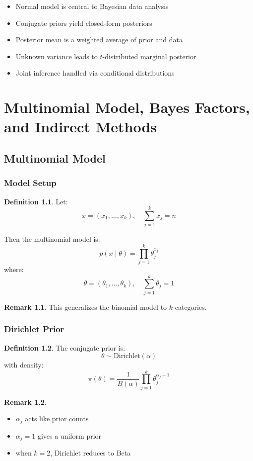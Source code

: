 \documentclass[12pt,oneside]{book}
\numberwithin{equation}{section}
\theoremstyle{definition}
\newtheorem{definition}{Definition}[section]
\newtheorem{remark}{Remark}[section]
\theoremstyle{plain}
\theoremstyle{remark}
\newcommand{\Dir}{\mathrm{Dirichlet}}
\begin{document}
\begin{itemize}
\item Normal model is central to Bayesian data analysis
\item Conjugate priors yield closed-form posteriors
\item Posterior mean is a weighted average of prior and data
\item Unknown variance leads to $t$-distributed marginal posterior
\item Joint inference handled via conditional distributions
\end{itemize}

\chapter{Multinomial Model, Bayes Factors, and Indirect Methods}

\section{Multinomial Model}

\subsection{Model Setup}

\begin{definition}
Let:
$$
x = (x_1, \dots, x_k), \quad \sum_{j=1}^k x_j = n
$$

Then the multinomial model is:
$$
p(x \mid \theta)
=
\prod_{j=1}^k \theta_j^{x_j}
$$
where:
$$
\theta = (\theta_1, \dots, \theta_k), \quad \sum_{j=1}^k \theta_j = 1
$$
\end{definition}

\begin{remark}
This generalizes the binomial model to $k$ categories.  
\end{remark}

\subsection{Dirichlet Prior}

\begin{definition}
The conjugate prior is:
$$
\theta \sim \Dir(\alpha)
$$
with density:
$$
\pi(\theta)
=
\frac{1}{B(\alpha)}
\prod_{j=1}^k \theta_j^{\alpha_j - 1}
$$
\end{definition}

\begin{remark}
\begin{itemize}
\item $\alpha_j$ acts like prior counts
\item $\alpha_j = 1$ gives a uniform prior
\item when $k=2$, Dirichlet reduces to Beta
\end{itemize}
\end{remark}
\end{document}

